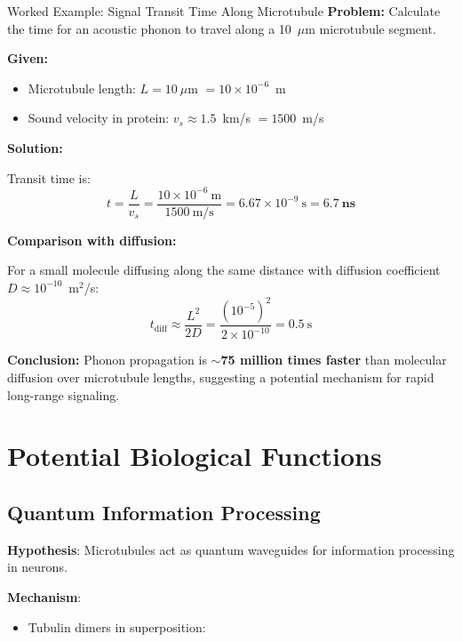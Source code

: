 \begin{calloutbox}{Worked Example: Signal Transit Time Along Microtubule}
\textbf{Problem:} Calculate the time for an acoustic phonon to travel along a 10~$\mu$m microtubule segment.

\textbf{Given:}
\begin{itemize}
\item Microtubule length: $L = 10~\mu$m $= 10 \times 10^{-6}$~m
\item Sound velocity in protein: $v_s \approx 1.5$~km/s $= 1500$~m/s
\end{itemize}

\textbf{Solution:}

Transit time is:
\begin{equation}
t = \frac{L}{v_s} = \frac{10 \times 10^{-6}~\text{m}}{1500~\text{m/s}} = 6.67 \times 10^{-9}~\text{s} = \mathbf{6.7~\text{ns}}
\end{equation}

\textbf{Comparison with diffusion:}

For a small molecule diffusing along the same distance with diffusion coefficient $D \approx 10^{-10}$~m$^2$/s:
\begin{equation}
t_{\text{diff}} \approx \frac{L^2}{2D} = \frac{(10^{-5})^2}{2 \times 10^{-10}} = 0.5~\text{s}
\end{equation}

\textbf{Conclusion:} Phonon propagation is \textbf{$\sim$75 million times faster} than molecular diffusion over microtubule lengths, suggesting a potential mechanism for rapid long-range signaling.
\end{calloutbox}



\section{Potential Biological Functions}\label{potential-biological-functions-speculative}

\subsection{Quantum Information Processing}\label{quantum-information-processing}

\textbf{Hypothesis}: Microtubules act as quantum waveguides for
information processing in neurons.

\textbf{Mechanism}:
\begin{itemize}
\item Tubulin dimers in superposition:
\end{itemize}

